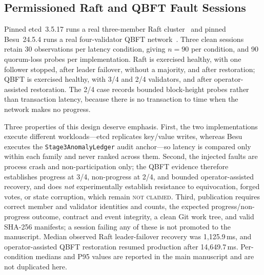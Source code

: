 \documentclass[journal]{IEEEtran}
\newif\ifshowrevisions
\newcommand{\rev}[1]{{\ifshowrevisions\color{blue}\else\color{black}\fi #1}}
\newcommand{\Eabsent}{\textsc{not claimed}}
\begin{document}
\subsection{Permissioned Raft and QBFT Fault Sessions}
\label{sec:raftqbft}
Pinned etcd~3.5.17 runs a real three-member Raft cluster~\rev{\cite{raft}} and pinned
Besu~24.5.4 runs a real four-validator QBFT network~\rev{\cite{besu}}. Three clean sessions
retain 30 observations per latency condition, giving $n=90$ per condition, and
90 quorum-loss probes per implementation. Raft is exercised healthy, with one
follower stopped, after leader failover, without a majority, and after
restoration; QBFT is exercised healthy, with 3/4 and 2/4 validators, and after
operator-assisted restoration. The 2/4 case records bounded block-height
probes rather than transaction latency, because there is no transaction to
time when the network makes no progress.

Three properties of this design deserve emphasis. First, the two
implementations execute different workloads---etcd replicates key/value
writes, whereas Besu executes the \texttt{Stage3AnomalyLedger} audit
anchor---so latency is compared only within each family and never ranked
across them. Second, the injected faults are process crash and
non-participation only; the QBFT evidence therefore establishes progress at
3/4, non-progress at 2/4, and bounded operator-assisted recovery, and does
\emph{not} experimentally establish resistance to equivocation, forged votes,
or state corruption, which remain \Eabsent{}. Third, publication requires
correct member and validator identities and counts, the expected
progress/non-progress outcome, contract and event integrity, a clean Git work
tree, and valid SHA-256 manifests; a session failing any of these is not
promoted to the manuscript. Median observed Raft leader-failover recovery was
1{,}125.9\,ms, and operator-assisted QBFT restoration resumed production after
14{,}649.7\,ms. Per-condition medians and P95 values are reported in the main
manuscript and are not duplicated here.
\end{document}
